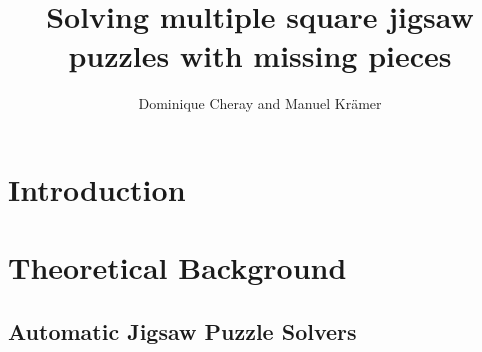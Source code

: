 \documentclass[]{report}
\title{Solving multiple square jigsaw puzzles with missing pieces}
\author{Dominique Cheray and Manuel Krämer}
\begin{document}
\maketitle

\begin{abstract}
\end{abstract}

\tableofcontents

\chapter{Introduction}

\chapter{Theoretical Background}
\section{Automatic Jigsaw Puzzle Solvers}
\end{document}

